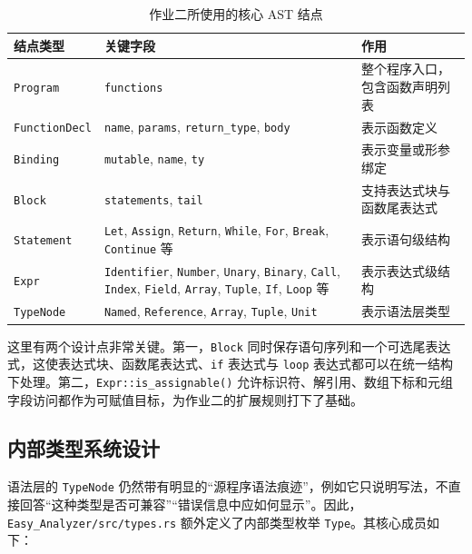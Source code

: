 \documentclass[UTF8,a4paper,12pt]{ctexart}
\newcommand{\pkg}[1]{\texttt{#1}}
\begin{document}
\begin{table}[H]
    \centering
    \caption{作业二所使用的核心 AST 结点}
    \label{tab:ast-nodes}
    \begin{tabularx}{\textwidth}{P{3cm}P{4cm}Y}
        \toprule
        结点类型 & 关键字段 & 作用 \\
        \midrule
        \pkg{Program} & \pkg{functions} & 整个程序入口，包含函数声明列表 \\
        \pkg{FunctionDecl} & \pkg{name}, \pkg{params}, \pkg{return\_type}, \pkg{body} & 表示函数定义 \\
        \pkg{Binding} & \pkg{mutable}, \pkg{name}, \pkg{ty} & 表示变量或形参绑定 \\
        \pkg{Block} & \pkg{statements}, \pkg{tail} & 支持表达式块与函数尾表达式 \\
        \pkg{Statement} & \pkg{Let}, \pkg{Assign}, \pkg{Return}, \pkg{While}, \pkg{For}, \pkg{Break}, \pkg{Continue} 等 & 表示语句级结构 \\
        \pkg{Expr} & \pkg{Identifier}, \pkg{Number}, \pkg{Unary}, \pkg{Binary}, \pkg{Call}, \pkg{Index}, \pkg{Field}, \pkg{Array}, \pkg{Tuple}, \pkg{If}, \pkg{Loop} 等 & 表示表达式级结构 \\
        \pkg{TypeNode} & \pkg{Named}, \pkg{Reference}, \pkg{Array}, \pkg{Tuple}, \pkg{Unit} & 表示语法层类型 \\
        \bottomrule
    \end{tabularx}
\end{table}

这里有两个设计点非常关键。第一，\pkg{Block} 同时保存语句序列和一个可选尾表达式，这使表达式块、函数尾表达式、\pkg{if} 表达式与 \pkg{loop} 表达式都可以在统一结构下处理。第二，\pkg{Expr::is\_assignable()} 允许标识符、解引用、数组下标和元组字段访问都作为可赋值目标，为作业二的扩展规则打下了基础。

\subsection{内部类型系统设计}

语法层的 \pkg{TypeNode} 仍然带有明显的“源程序语法痕迹”，例如它只说明写法，不直接回答“这种类型是否可兼容”“错误信息中应如何显示”。因此，\pkg{Easy\_Analyzer/src/types.rs} 额外定义了内部类型枚举 \pkg{Type}。其核心成员如下：
\end{document}
